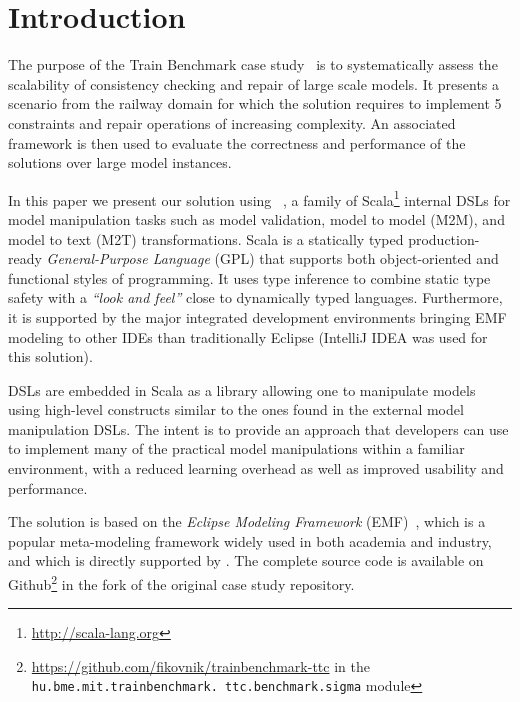 
\enlargethispage{10mm}

\section{Introduction}
\label{sec:Introduction}

The purpose of the \TTC Train Benchmark case study~\cite{Szarnyas2015} is to systematically assess the scalability of consistency checking and repair of large scale models.
It presents a scenario from the railway domain for which the solution requires to implement 5 constraints and repair operations of increasing complexity.
An associated framework is then used to evaluate the correctness and performance of the solutions over large model instances. 

%
In this paper we present our solution using \SIGMA~\cite{Krikava2014}, a family of Scala\footnote{\url{http://scala-lang.org}} internal DSLs for model manipulation tasks such as model validation, model to model (M2M), and model to text (M2T) transformations.
Scala is a statically typed production-ready \emph{General-Purpose Language} (GPL) that supports both object-oriented and functional styles of programming.
It uses type inference to combine static type safety with a \emph{``look and feel''} close to dynamically typed languages.
Furthermore, it is supported by the major integrated development environments bringing EMF modeling to other IDEs than traditionally Eclipse (\Eg IntelliJ IDEA was used for this solution).

\SIGMA DSLs are embedded in Scala as a library allowing one to manipulate models using high-level constructs similar to the ones found in the external model manipulation DSLs.
The intent is to provide an approach that developers can use to implement many of the practical model manipulations within a familiar environment, with a reduced learning overhead as well as improved usability and performance.

The solution is based on the \emph{Eclipse Modeling Framework} (EMF)~\cite{EMF}, which is a popular meta-modeling framework widely used in both academia and industry, and which is directly supported by \SIGMA.
The complete source code is available on Github\footnote{\url{https://github.com/fikovnik/trainbenchmark-ttc} in the \texttt{hu.bme.mit.trainbenchmark. ttc.benchmark.sigma} module} in the fork of the original case study repository.

